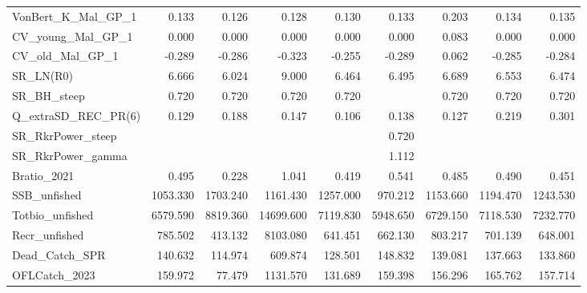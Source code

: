 \documentclass[11pt,
  english,
]{article}
\begin{document}
\begin{table}
{\begin{tabular}[t]{lrrrrrrrr}
VonBert\_K\_Mal\_GP\_1 & 0.133 & 0.126 & 0.128 & 0.130 & 0.133 & 0.203 & 0.134 & 0.135\\
CV\_young\_Mal\_GP\_1 & 0.000 & 0.000 & 0.000 & 0.000 & 0.000 & 0.083 & 0.000 & 0.000\\
CV\_old\_Mal\_GP\_1 & -0.289 & -0.286 & -0.323 & -0.255 & -0.289 & 0.062 & -0.285 & -0.284\\
SR\_LN(R0) & 6.666 & 6.024 & 9.000 & 6.464 & 6.495 & 6.689 & 6.553 & 6.474\\
SR\_BH\_steep & 0.720 & 0.720 & 0.720 & 0.720 &  & 0.720 & 0.720 & 0.720\\
Q\_extraSD\_REC\_PR(6) & 0.129 & 0.188 & 0.147 & 0.106 & 0.138 & 0.127 & 0.219 & 0.301\\
SR\_RkrPower\_steep &  &  &  &  & 0.720 &  &  & \\
SR\_RkrPower\_gamma &  &  &  &  & 1.112 &  &  & \\
Bratio\_2021 & 0.495 & 0.228 & 1.041 & 0.419 & 0.541 & 0.485 & 0.490 & 0.451\\
SSB\_unfished & 1053.330 & 1703.240 & 1161.430 & 1257.000 & 970.212 & 1153.660 & 1194.470 & 1243.530\\
Totbio\_unfished & 6579.590 & 8819.360 & 14699.600 & 7119.830 & 5948.650 & 6729.150 & 7118.530 & 7232.770\\
Recr\_unfished & 785.502 & 413.132 & 8103.080 & 641.451 & 662.130 & 803.217 & 701.139 & 648.001\\
Dead\_Catch\_SPR & 140.632 & 114.974 & 609.874 & 128.501 & 148.832 & 139.081 & 137.663 & 133.860\\
OFLCatch\_2023 & 159.972 & 77.479 & 1131.570 & 131.689 & 159.398 & 156.296 & 165.762 & 157.714\\
\bottomrule
\end{tabular}}
\end{table}
\end{document}
